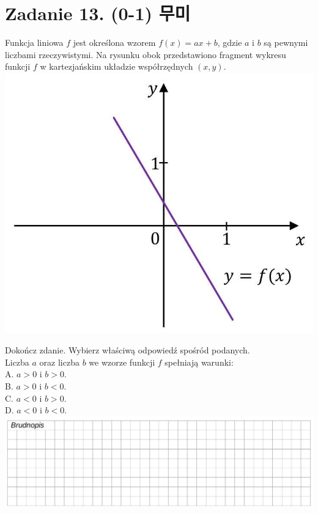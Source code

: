 \documentclass[10pt]{article}
\begin{document}
\section*{Zadanie 13. (0-1) 무미}
Funkcja liniowa \(f\) jest określona wzorem \(f(x)=a x+b\), gdzie \(a\) i \(b\) są pewnymi liczbami rzeczywistymi. Na rysunku obok przedstawiono fragment wykresu funkcji \(f\) w kartezjańskim układzie współrzędnych \((x, y)\).\\
\includegraphics[max width=\textwidth, center]{2024_11_21_51cb67544fb9b029f01cg-13}

Dokończ zdanie. Wybierz właściwą odpowiedź spośród podanych.\\
Liczba \(a\) oraz liczba \(b\) we wzorze funkcji \(f\) spełniają warunki:\\
A. \(a>0\) i \(b>0\).\\
B. \(a>0\) i \(b<0\).\\
C. \(a<0\) i \(b>0\).\\
D. \(a<0\) i \(b<0\).\\
\includegraphics[max width=\textwidth, center]{2024_11_21_51cb67544fb9b029f01cg-13(1)}
\end{document}

